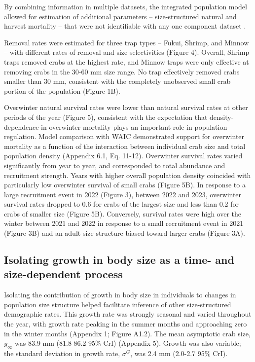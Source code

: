 \documentclass{article}
\begin{document}
By combining information in multiple datasets, the integrated population model allowed for estimation of additional parameters -- size-structured natural and harvest mortality -- that were not identifiable with any one component dataset \parencite{riecke2019integrated}.

Removal rates were estimated for three trap types -- Fukui, Shrimp, and Minnow -- with different rates of removal and size selectivities (Figure 4). Overall, Shrimp traps removed crabs at the highest rate, and Minnow traps were only effective at removing crabs in the 30-60 mm size range. No trap effectively removed crabs smaller than 30 mm, consistent with the completely unobserved small crab portion of the population (Figure 1B).

Overwinter natural survival rates were lower than natural survival rates at other periods of the year (Figure 5), consistent with the expectation that density-dependence in overwinter mortality plays an important role in population regulation. Model comparison with WAIC demonstrated support for overwinter mortality as a function of the interaction between individual crab size and total population density (Appendix 6.1, Eq. 11-12). Overwinter survival rates varied significantly from year to year, and corresponded to total abundance and recruitment strength. Years with higher overall population density coincided with particularly low overwinter survival of small crabs (Figure 5B). In response to a large recruitment event in 2022 (Figure 3), between 2022 and 2023, overwinter survival rates dropped to 0.6 for crabs of the largest size and less than 0.2 for crabs of smaller size (Figure 5B). Conversely, survival rates were high over the winter between 2021 and 2022 in response to a small recruitment event in 2021 (Figure 3B) and an adult size structure biased toward larger crabs (Figure 3A). 

\subsection{Isolating growth in body size as a time- and size-dependent process}

Isolating the contribution of growth in body size in individuals to changes in population size structure helped facilitate inference of other size-structured demographic rates. This growth rate was strongly seasonal and varied throughout the year, with growth rate peaking in the summer months and approaching zero in the winter months (Appendix 1; Figure A1.2). The mean asymptotic crab size, $y_{\infty}$ was 83.9 mm (81.8-86.2 95\% CrI) (Appendix 5). Growth was also variable; the standard deviation in growth rate, $\sigma^G$, was 2.4 mm (2.0-2.7 95\% CrI).
\end{document}
